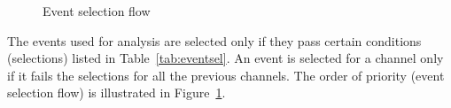 \documentclass[letterpaper,12pt]{article}
\begin{document}
\begin{figure}
  \scriptsize
  \centering
{}

\caption{Event selection flow}
\label{fig:eventselflow}
\end{figure}

The events used for analysis are selected only if they pass certain conditions (selections) listed in Table~\ref{tab:eventsel}. An event is selected for a channel only if it fails the selections for all the previous channels. The order of priority (event selection flow) is illustrated in Figure~\ref{fig:eventselflow}.
\end{document}
